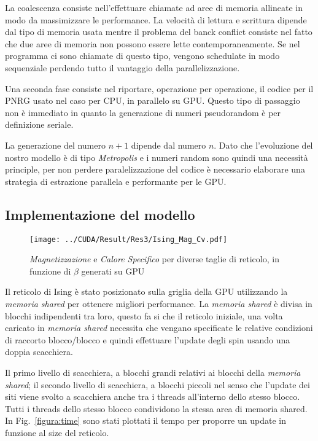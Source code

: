 \documentclass[a4paper,12pt]{article}
\begin{document}
La coalescenza consiste nell'effettuare chiamate ad aree di memoria allineate in modo da massimizzare le performance. La velocit\`a di lettura e scrittura dipende dal tipo di memoria usata mentre il problema del banck conflict consiste nel fatto che due aree di memoria non possono essere lette contemporaneamente. Se nel programma ci sono chiamate di questo tipo, vengono schedulate in modo sequenziale perdendo tutto il vantaggio della parallelizzazione.

Una seconda fase consiste nel riportare, operazione per operazione, il codice per il PNRG usato nel caso per CPU, in parallelo su GPU. Questo tipo di passaggio non è immediato in quanto la generazione di numeri pseudorandom è per definizione seriale. 

La generazione del numero $n+1$ dipende dal numero $n$. Dato che l'evoluzione del nostro modello è di tipo \emph{Metropolis} e i numeri random sono quindi una necessit\`a principle, per non perdere paralelizzazione del codice è necessario elaborare una strategia di estrazione parallela e performante per le GPU.

\subsection*{Implementazione del modello}
\begin{figure}
	\centering
		\texttt{[image: ../CUDA/Result/Res3/Ising\_Mag\_Cv.pdf]}
		\caption{\emph{Magnetizzazione} e \emph{Calore Specifico} per diverse taglie di reticolo, in funzione di $\beta$ generati su GPU}
		\label{figura:GPU}
\end{figure}
Il reticolo di Ising è stato posizionato sulla griglia della GPU utilizzando la \emph{memoria shared} per ottenere migliori performance. La \emph{memoria shared} è divisa in blocchi indipendenti tra loro, questo fa si che il reticolo iniziale, una volta caricato in \emph{memoria shared} necessita che vengano specificate le relative condizioni di raccorto blocco/blocco e quindi effettuare l'update degli spin usando una doppia scacchiera. 

Il primo livello di scacchiera, a blocchi grandi relativi ai blocchi della \emph{memoria shared}; il secondo livello di scacchiera, a blocchi piccoli nel senso che l'update dei siti viene svolto a scacchiera anche tra i threads all'interno dello stesso blocco. Tutti i threads dello stesso blocco condividono la stessa area di memoria shared. In Fig.~\ref{figura:time} sono stati plottati il tempo per proporre un update in funzione al size del reticolo.
\end{document}

